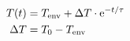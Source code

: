 \begin{align}
    T(t) &= T_{\mathrm{env}} + \Delta T \cdot \mathrm{e}^{-t/\tau} \\
    \Delta T &= T_0 - T_{\mathrm{env}} \notag
\end{align}
